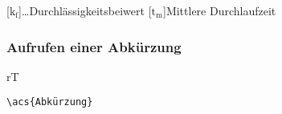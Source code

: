 \setlength{\columnsep}{20pt}
\twocolumn
{}
\label{sec:abkurzung}



\begin{acronym}
[$\text{k}_\text{f}$]\ldots{Durchlässigkeitsbeiwert}
[$\text{t}_\text{m}$]{Mittlere Durchlaufzeit}

\end{acronym}

\subsubsection*{Aufrufen einer Abkürzung}
\acs{rT}
\begin{verbatim}
\acs{Abkürzung}
\end{verbatim}